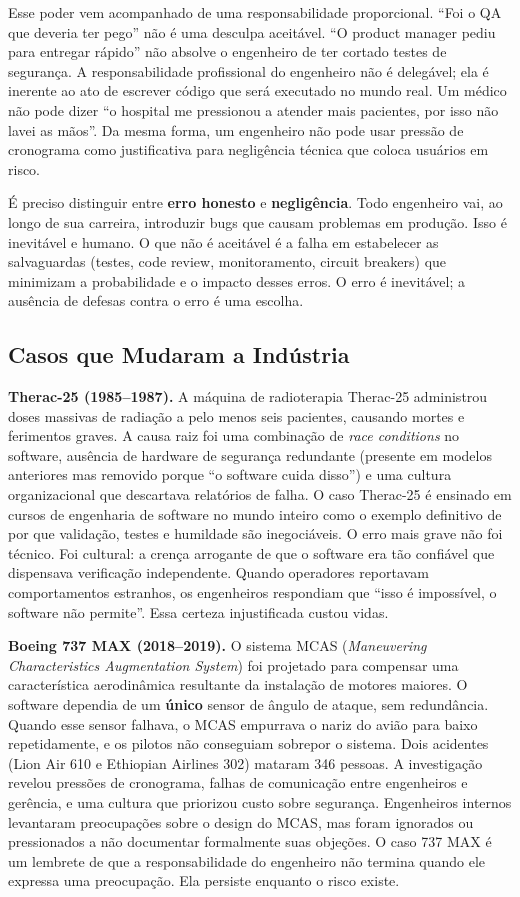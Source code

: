 Esse poder vem acompanhado de uma responsabilidade proporcional. ``Foi o
QA que deveria ter pego'' não é uma desculpa aceitável. ``O product
manager pediu para entregar rápido'' não absolve o engenheiro de ter
cortado testes de segurança. A responsabilidade profissional do
engenheiro não é delegável; ela é inerente ao ato de escrever código
que será executado no mundo real. Um médico não pode dizer ``o hospital
me pressionou a atender mais pacientes, por isso não lavei as mãos''.
Da mesma forma, um engenheiro não pode usar pressão de cronograma como
justificativa para negligência técnica que coloca usuários em risco.

É preciso distinguir entre \textbf{erro honesto} e
\textbf{negligência}. Todo engenheiro vai, ao longo de sua carreira,
introduzir bugs que causam problemas em produção. Isso é inevitável e
humano. O que não é aceitável é a falha em estabelecer as salvaguardas
(testes, code review, monitoramento, circuit breakers) que
minimizam a probabilidade e o impacto desses erros. O erro é inevitável;
a ausência de defesas contra o erro é uma escolha.

\subsection{Casos que Mudaram a Indústria}

\textbf{Therac-25 (1985--1987).} A máquina de radioterapia Therac-25
administrou doses massivas de radiação a pelo menos seis pacientes,
causando mortes e ferimentos graves. A causa raiz foi uma combinação de
\emph{race conditions} no software, ausência de hardware de segurança
redundante (presente em modelos anteriores mas removido porque ``o
software cuida disso'') e uma cultura organizacional que descartava
relatórios de falha. O caso Therac-25 é ensinado em cursos de engenharia
de software no mundo inteiro como o exemplo definitivo de por que
validação, testes e humildade são inegociáveis. O erro mais grave não
foi técnico. Foi cultural: a crença arrogante de que o software era
tão confiável que dispensava verificação independente. Quando operadores
reportavam comportamentos estranhos, os engenheiros respondiam que
``isso é impossível, o software não permite''. Essa certeza injustificada
custou vidas.

\textbf{Boeing 737 MAX (2018--2019).} O sistema MCAS (\emph{Maneuvering
Characteristics Augmentation System}) foi projetado para compensar uma
característica aerodinâmica resultante da instalação de motores maiores.
O software dependia de um \textbf{único} sensor de ângulo de ataque, sem
redundância. Quando esse sensor falhava, o MCAS empurrava o nariz do
avião para baixo repetidamente, e os pilotos não conseguiam sobrepor o
sistema. Dois acidentes (Lion Air 610 e Ethiopian Airlines 302)
mataram 346 pessoas. A investigação revelou pressões de cronograma,
falhas de comunicação entre engenheiros e gerência, e uma cultura que
priorizou custo sobre segurança. Engenheiros internos levantaram
preocupações sobre o design do MCAS, mas foram ignorados ou pressionados
a não documentar formalmente suas objeções. O caso 737 MAX é um lembrete
de que a responsabilidade do engenheiro não termina quando ele expressa
uma preocupação. Ela persiste enquanto o risco existe.

